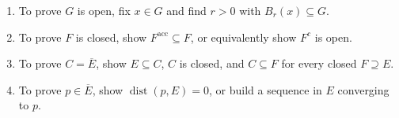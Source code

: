 \begin{method} \label{meth:metric-topology-proof-patterns}\label{meth:metric-topology-proof-patterns-source-todo} 
\begin{enumerate}[label=(\roman*)]
\setlength{\itemsep}{0pt}
\item To prove $G$ is open, fix $x\in G$ and find $r>0$ with $B_r(x)\subseteq G$.
\item To prove $F$ is closed, show $F^{\operatorname{acc}}\subseteq F$, or equivalently show $F^c$ is open.
\item To prove $C=\overline{E}$, show $E\subseteq C$, $C$ is closed, and $C\subseteq F$ for every closed $F\supseteq E$.
\item To prove $p\in\overline{E}$, show $\operatorname{dist}(p,E)=0$, or build a sequence in $E$ converging to $p$.
\end{enumerate}
\end{method}
